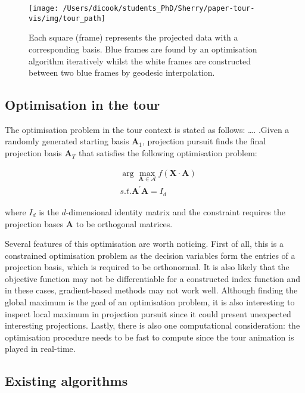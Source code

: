 \documentclass[12pt]{article}
\begin{document}
\begin{figure}

{\centering \texttt{[image: /Users/dicook/students\_PhD/Sherry/paper-tour-vis/img/tour\_path]} 

}

\caption{Each square (frame) represents the projected data with a corresponding basis. Blue frames are found by an optimisation algorithm iteratively whilst the white frames are constructed between two blue frames by geodesic interpolation.}\label{fig:tour-path}
\end{figure}



\hypertarget{tour-optim}{%
\subsection{Optimisation in the tour}\label{tour-optim}}

The optimisation problem in the tour context is stated as follows:
\ldots.
.Given a randomly generated starting basis \(\mathbf{A}_1\), projection pursuit finds the final projection basis \(\mathbf{A}_T\) that satisfies the following optimisation problem:

\begin{align}
&\arg \max_{\mathbf{A} \in \mathcal{A}} f(\mathbf{X} \cdot \mathbf{A}) \\
&s.t.  \mathbf{A}^{\prime} \mathbf{A} = I_d
\end{align}

where \(I_d\) is the \(d\)-dimensional identity matrix and the constraint requires the projection bases \(\mathbf{A}\) to be orthogonal matrices.

Several features of this optimisation are worth noticing. First of all, this is a constrained optimisation problem as the decision variables form the entries of a projection basis, which is required to be orthonormal. It is also likely that the objective function may not be differentiable for a constructed index function and in these cases, gradient-based methods may not work well. Although finding the global maximum is the goal of an optimisation problem, it is also interesting to inspect local maximum in projection pursuit since it could present unexpected interesting projections. Lastly, there is also one computational consideration: the optimisation procedure needs to be fast to compute since the tour animation is played in real-time.

\hypertarget{existing-algorithms}{%
\subsection{Existing algorithms}\label{existing-algorithms}}
\end{document}
